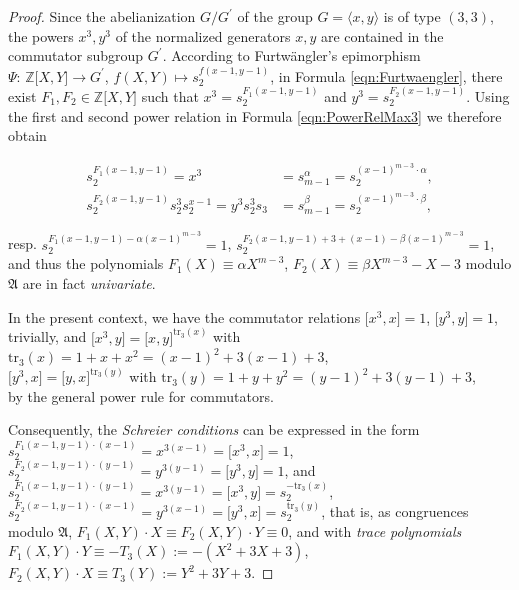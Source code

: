 \documentclass{amsart}
\theoremstyle{definition}
\numberwithin{equation}{section}
\begin{document}
\begin{proof}
Since the abelianization \(G/G^\prime\) of the group \(G=\langle x,y\rangle\) is of type \((3,3)\),
the powers \(x^3,y^3\) of the normalized generators \(x,y\) are contained in the commutator subgroup \(G^\prime\).
According to Furtw\"angler's epimorphism
\(\Psi:\,\mathbb{Z}\lbrack X,Y\rbrack\to G^\prime\), \(f(X,Y)\mapsto s_2^{f(x-1,y-1)}\),
in Formula
\eqref{eqn:Furtwaengler},
there exist \(F_1,F_2\in\mathbb{Z}\lbrack X,Y\rbrack\) such that
\(x^3=s_2^{F_1(x-1,y-1)}\) and \(y^3=s_2^{F_2(x-1,y-1)}\).
Using the first and second power relation in Formula
\eqref{eqn:PowerRelMax3}
we therefore obtain

\begin{equation*}
\begin{aligned}
s_2^{F_1(x-1,y-1)}=x^3                       &= s_{m-1}^\alpha=s_2^{(x-1)^{m-3}\cdot\alpha}, \\
s_2^{F_2(x-1,y-1)}s_2^3s_2^{x-1}=y^3s_2^3s_3 &= s_{m-1}^\beta=s_2^{(x-1)^{m-3}\cdot\beta},
\end{aligned}
\end{equation*}

\noindent
resp. \(s_2^{F_1(x-1,y-1)-\alpha(x-1)^{m-3}}=1\), \(s_2^{F_2(x-1,y-1)+3+(x-1)-\beta(x-1)^{m-3}}=1\),
and thus the polynomials
\(F_1(X)\equiv\alpha X^{m-3}\), \(F_2(X)\equiv\beta X^{m-3}-X-3\) modulo \(\mathfrak{A}\)
are in fact \textit{univariate}.

In the present context, we have the commutator relations
\(\lbrack x^3,x\rbrack=1\),
\(\lbrack y^3,y\rbrack=1\), trivially, and
\(\lbrack x^3,y\rbrack=\lbrack x,y\rbrack^{\mathrm{tr}_3(x)}\) with \(\mathrm{tr}_3(x)=1+x+x^2=(x-1)^2+3(x-1)+3\),\\
\(\lbrack y^3,x\rbrack=\lbrack y,x\rbrack^{\mathrm{tr}_3(y)}\) with \(\mathrm{tr}_3(y)=1+y+y^2=(y-1)^2+3(y-1)+3\),\\
by the general power rule for commutators.

Consequently, the \textit{Schreier conditions} can be expressed in the form\\
\(s_2^{F_1(x-1,y-1)\cdot(x-1)}=x^{3(x-1)}=\lbrack x^3,x\rbrack=1\), \quad
\(s_2^{F_2(x-1,y-1)\cdot(y-1)}=y^{3(y-1)}=\lbrack y^3,y\rbrack=1\), and\\
\(s_2^{F_1(x-1,y-1)\cdot(y-1)}=x^{3(y-1)}=\lbrack x^3,y\rbrack=s_2^{-\mathrm{tr}_3(x)}\), \quad
\(s_2^{F_2(x-1,y-1)\cdot(x-1)}=y^{3(x-1)}=\lbrack y^3,x\rbrack=s_2^{\mathrm{tr}_3(y)}\),
that is, as congruences modulo \(\mathfrak{A}\),
\(F_1(X,Y)\cdot X\equiv F_2(X,Y)\cdot Y\equiv 0\), and with \textit{trace polynomials}
\(F_1(X,Y)\cdot Y\equiv -T_3(X):=-(X^2+3X+3)\), \quad
\(F_2(X,Y)\cdot X\equiv T_3(Y):=Y^2+3Y+3\).
\end{proof}
\end{document}

